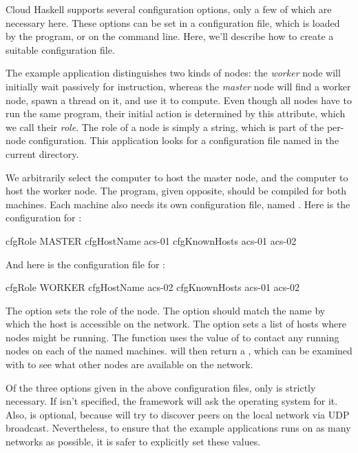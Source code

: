 \documentclass{sigplanconf}
\begin{document}
Cloud Haskell supports several configuration options, only a few of which are necessary here. These options can be set in a configuration file, which is loaded by the program, or on the command line. Here, we'll describe how to create a suitable configuration file.

The example application distinguishes two kinds of nodes: the {\em worker} node will initially wait passively for instruction, whereas the {\em master} node will find a worker node, spawn a thread on it, and use it to compute. Even though all nodes have to run the same program, their initial action is determined by this attribute, which we call their {\em role}. The role of a node is simply a string, which is part of the per-node configuration. This application looks for a configuration file named  in the current directory.

We arbitrarily select the computer  to host the master node, and the computer  to host the worker node. The program, given opposite, should be compiled for both machines. Each machine also needs its own configuration file, named . Here is the configuration for :

\begin{code}
cfgRole MASTER
cfgHostName acs-01
cfgKnownHosts acs-01 acs-02
\end{code}

\noindent
And here is the configuration file for :

\begin{code}
cfgRole WORKER
cfgHostName acs-02
cfgKnownHosts acs-01 acs-02
\end{code}

The  option sets the role of the node. The  option should match the name by which the host is accessible on the network. The  option sets a list of hosts where nodes might be running. The  function uses the value of  to contact any running nodes on each of the named machines.  will then return a , which can be examined with  to see what other nodes are available on the network.

Of the three options given in the above configuration files, only  is strictly necessary. If  isn't specified, the framework will ask the operating system for it. Also,  is optional, because  will try to discover peers on the local network via UDP broadcast. Nevertheless, to ensure that the example applications runs on as many networks as possible, it is safer to explicitly set these values.
\end{document}
